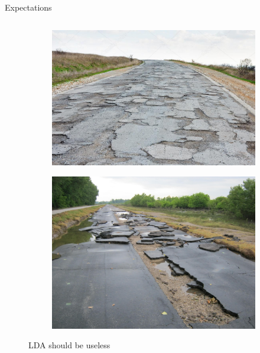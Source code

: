 \documentclass{beamer}
\begin{document}
\begin{frame}[t]{Expectations}
\begin{columns}
\begin{column}{0.48\textwidth}
\begin{figure}[t]
\begin{subfigure}{.9\textwidth}
  		  \includegraphics[width=1.\linewidth]{LDA_approx.jpg}
 	     \end{subfigure}
 	     \begin{subfigure}{.9\textwidth}
  		  \includegraphics[width=1.\linewidth]{LDA_breaks.jpg}  
 	     \end{subfigure}
	     \caption{LDA should be useless}
	    \end{figure}
      \end{column}
	 \end{columns}
	\end{frame}
	
\end{document}

